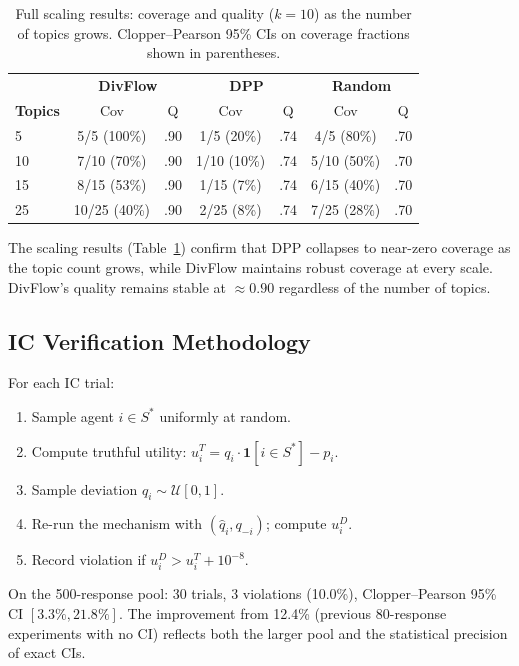 \documentclass[10pt]{article}
\begin{document}
\begin{table}[H]
\centering
\caption{Full scaling results: coverage and quality ($k{=}10$) as the number of topics grows.
Clopper--Pearson 95\% CIs on coverage fractions shown in parentheses.}
\label{tab:scaling-full}
\small
\begin{tabular}{l|cc|cc|cc}
\toprule
& \multicolumn{2}{c|}{\textbf{DivFlow}} & \multicolumn{2}{c|}{\textbf{DPP}} & \multicolumn{2}{c}{\textbf{Random}} \\
\textbf{Topics} & Cov & Q & Cov & Q & Cov & Q \\
\midrule
5  & 5/5 (100\%) & .90 & 1/5 (20\%) & .74 & 4/5 (80\%) & .70 \\
10 & 7/10 (70\%) & .90 & 1/10 (10\%) & .74 & 5/10 (50\%) & .70 \\
15 & 8/15 (53\%) & .90 & 1/15 (7\%) & .74 & 6/15 (40\%) & .70 \\
25 & 10/25 (40\%) & .90 & 2/25 (8\%) & .74 & 7/25 (28\%) & .70 \\
\bottomrule
\end{tabular}
\end{table}

The scaling results (Table~\ref{tab:scaling-full}) confirm that DPP collapses to near-zero coverage as the topic count grows, while DivFlow maintains robust coverage at every scale.
DivFlow's quality remains stable at $\approx 0.90$ regardless of the number of topics.

\subsection{IC Verification Methodology}

For each IC trial:
\begin{enumerate}[leftmargin=*,itemsep=1pt]
\item Sample agent $i \in S^*$ uniformly at random.
\item Compute truthful utility: $u_i^T = q_i \cdot \mathbf{1}[i \in S^*] - p_i$.
\item Sample deviation $\hat{q}_i \sim \mathcal{U}[0, 1]$.
\item Re-run the mechanism with $(\hat{q}_i, q_{-i})$; compute $u_i^D$.
\item Record violation if $u_i^D > u_i^T + 10^{-8}$.
\end{enumerate}

On the 500-response pool: 30 trials, 3 violations (10.0\%), Clopper--Pearson 95\% CI $[3.3\%, 21.8\%]$.
The improvement from 12.4\% (previous 80-response experiments with no CI) reflects both the larger pool and the statistical precision of exact CIs.
\end{document}
